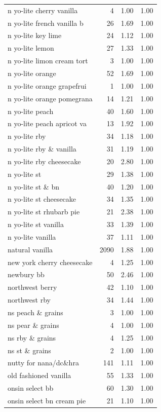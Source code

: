 \begin{table}
\begin{tabular}{lrrr}
n yo-lite cherry vanilla & 4 & 1.00 & 1.00 \\
n yo-lite french vanilla b & 26 & 1.69 & 1.00 \\
n yo-lite key lime & 24 & 1.12 & 1.00 \\
n yo-lite lemon & 27 & 1.33 & 1.00 \\
n yo-lite limon cream tort & 3 & 1.00 & 1.00 \\
n yo-lite orange & 52 & 1.69 & 1.00 \\
n yo-lite orange grapefrui & 1 & 1.00 & 1.00 \\
n yo-lite orange pomegrana & 14 & 1.21 & 1.00 \\
n yo-lite peach & 40 & 1.60 & 1.00 \\
n yo-lite peach apricot va & 13 & 1.92 & 1.00 \\
n yo-lite rby & 34 & 1.18 & 1.00 \\
n yo-lite rby \& vanilla & 31 & 1.19 & 1.00 \\
n yo-lite rby cheesecake & 20 & 2.80 & 1.00 \\
n yo-lite st & 29 & 1.38 & 1.00 \\
n yo-lite st \& bn & 40 & 1.20 & 1.00 \\
n yo-lite st cheesecake & 34 & 1.35 & 1.00 \\
n yo-lite st rhubarb pie & 21 & 2.38 & 1.00 \\
n yo-lite st vanilla & 33 & 1.39 & 1.00 \\
n yo-lite vanilla & 37 & 1.11 & 1.00 \\
natural vanilla & 2090 & 1.88 & 1.00 \\
new york cherry cheesecake & 4 & 1.25 & 1.00 \\
newbury bb & 50 & 2.46 & 1.00 \\
northwest berry & 42 & 1.10 & 1.00 \\
northwest rby & 34 & 1.44 & 1.00 \\
ns peach \& grains & 3 & 1.00 & 1.00 \\
ns pear \& grains & 4 & 1.00 & 1.00 \\
ns rby \& grains & 4 & 1.25 & 1.00 \\
ns st \& grains & 2 & 1.00 & 1.00 \\
nutty for nana/dc\&hra & 141 & 1.11 & 1.00 \\
old fashioned vanilla & 55 & 1.33 & 1.00 \\
onsin select bb & 60 & 1.30 & 1.00 \\
onsin select bn cream pie & 21 & 1.10 & 1.00 \\

\end{tabular}
\end{table}
